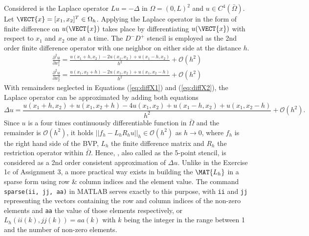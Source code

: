 \newcommand{\assignmentDate}{November 18th, 2019}



Considered is the Laplace operator $Lu = -\Delta$ in $\Omega = (0, L)^2$ and $u \in C^4(\bar{\Omega})$.
%
\newcommand{\bigO}[1]{\mathcal{O}(#1)}
\newcommand{\fixDot}{\;\cdot\;}
Let $\VECT{x} = [x_1, x_2]^T \in \Omega_h$.
Applying the Laplace operator in the form of finite difference on $u(\VECT{x})$ takes place by differentiating $u(\VECT{x})$ with respect to $x_1$ and $x_2$ one at a time.
The $D^-D^+$ stencil is employed as the 2nd order finite difference operator with one neighbor on either side at the distance $h$.
\begin{align}
	\label{eq:diffX1}
	\frac{\partial^2u}{\partial x_1 ^2} = \frac{u(x_1 + h, x_2) - 2u(x_1, x_2) + u(x_1 - h, x_2)}{h^2} + \bigO{h^2}\\
	\label{eq:diffX2}
	\frac{\partial^2u}{\partial x_2 ^2} = \frac{u(x_1, x_2 + h) - 2u(x_1, x_2) + u(x_1, x_2 - h)}{h^2} + \bigO{h^2}
\end{align}
With remainders neglected in Equations (\ref{eq:diffX1}) and (\ref{eq:diffX2}), the Laplace operator can be approximated by adding both equations
\begin{equation}
	\label{eq:deltaU}
	\Delta u = \frac{u(x_1 + h, x_2) + u(x_1, x_2 + h) - 4u(x_1, x_2) + u(x_1 - h, x_2) + u(x_1, x_2 - h)}{h^2} + \bigO{h^2} \text{.}
 \end{equation}
Since $u$ is a four times continuously differentiable function in $\bar{\Omega}$ and the remainder is $\bigO{h^2}$, it holds $|| f_h -L_h R_h u||_{h} \in \bigO{h^2}$ as $h\rightarrow 0$, where $f_h$ is the right hand side of the BVP, $L_h$ the finite difference matrix and $R_h$ the restriction operator within $\bar{\Omega}$.
Hence, , also called as the 5-point stencil, is considered as a 2nd order consistent approximation of $\Delta u$.
%
Unlike in the Exercise 1c of Assignment 3, a more practical way exists in building the $\MAT{L_h}$ in a sparse form using row \& column indices and the element value.
The command \texttt{sparse(ii, jj, aa)} in MATLAB serves exactly to this purpose, with \texttt{ii} and \texttt{jj} representing the vectors containing the row and column indices of the non-zero elements and \texttt{aa} the value of those elements respectively, or $L_h(ii(k),jj(k)) = aa(k)$ with $k$ being the integer in the range between 1 and the number of non-zero elements.
